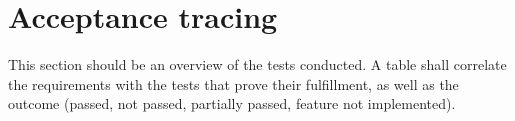 \section{Acceptance tracing}\label{sec:test_over}

This section should be an overview of the tests conducted.
A table shall correlate the requirements with the tests that prove their fulfillment, as well as the outcome (passed, not passed, partially passed, feature not implemented).
